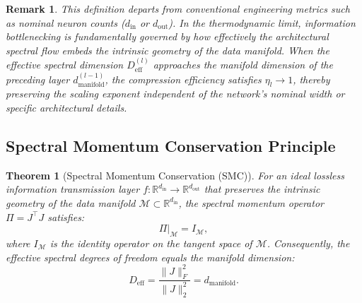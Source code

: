 \documentclass[11pt, a4paper]{article}
\newtheorem{theo}{Theorem}[section]
\theoremstyle{plain}
\newtheorem*{remark}{Remark}
\def\R{{\mathbb R}}
\def\sM{{\mathcal M}}
\begin{document}
\begin{remark}
This definition departs from conventional engineering metrics such as nominal neuron counts ($d_{\text{in}}$ or $d_{\text{out}}$). In the thermodynamic limit, information bottlenecking is fundamentally governed by how effectively the architectural spectral flow embeds the intrinsic geometry of the data manifold. When the effective spectral dimension $D_{\text{eff}}^{(l)}$ approaches the manifold dimension of the preceding layer $d_{\text{manifold}}^{(l-1)}$, the compression efficiency satisfies $\eta_l \to 1$, thereby preserving the scaling exponent independent of the network's nominal width or specific architectural details.
\end{remark}

\subsection{Spectral Momentum Conservation Principle}

\begin{theo}[Spectral Momentum Conservation (SMC)]\label{theo:smc}
For an ideal lossless information transmission layer $f: \R^{d_{\text{in}}} \to \R^{d_{\text{out}}}$ that preserves the intrinsic geometry of the data manifold $\sM \subset \R^{d_{\text{in}}}$, the spectral momentum operator $\Pi = J^\top J$ satisfies:
\begin{equation}
\Pi|_{\sM} = I_{\sM},
\end{equation}
where $I_{\sM}$ is the identity operator on the tangent space of $\sM$. Consequently, the effective spectral degrees of freedom equals the manifold dimension:
\begin{equation}
D_{\text{eff}} = \frac{\|J\|_F^2}{\|J\|_2^2} = d_{\text{manifold}}.
\end{equation}
\end{theo}
\end{document}
